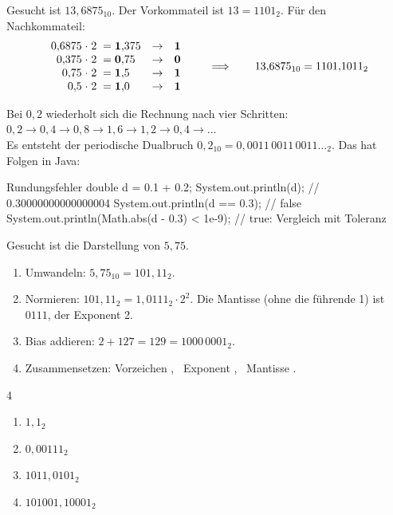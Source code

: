 Gesucht ist $13{,}6875_{10}$. Der Vorkommateil ist $13 = 1101_2$. Für den Nachkommateil:
\[
\begin{array}{r@{\;\cdot\;2\;=\;}l@{\quad\to\quad}c}
0{,}6875 & \mathbf{1}{,}375 & \mathbf{1} \\
0{,}375 & \mathbf{0}{,}75 & \mathbf{0} \\
0{,}75 & \mathbf{1}{,}5 & \mathbf{1} \\
0{,}5 & \mathbf{1}{,}0 & \mathbf{1}
\end{array}
\qquad\Longrightarrow\qquad 13{,}6875_{10} = 1101{,}1011_2
\]

Bei $0{,}2$ wiederholt sich die Rechnung nach vier Schritten: $0{,}2 \to 0{,}4 \to 0{,}8 \to 1{,}6 \to 1{,}2 \to 0{,}4 \to \ldots$\\
Es entsteht der periodische Dualbruch $0{,}2_{10} = 0{,}0011\,0011\,0011\ldots_2$. Das hat Folgen in Java:
\begin{javacode}[Ausschnitt]{Rundungsfehler}
double d = 0.1 + 0.2;
System.out.println(d);                            // 0.30000000000000004
System.out.println(d == 0.3);                     // false
System.out.println(Math.abs(d - 0.3) < 1e-9);     // true: Vergleich mit Toleranz
\end{javacode}

Gesucht ist die Darstellung von $5{,}75$.
\begin{enumerate}[itemsep=0.1em]
\item Umwandeln: $5{,}75_{10} = 101{,}11_2$.
\item Normieren: $101{,}11_2 = 1{,}0111_2 \cdot 2^2$. Die Mantisse (ohne die führende 1) ist $0111$, der Exponent 2.
\item Bias addieren: $2 + 127 = 129 = 1000\,0001_2$.
\item Zusammensetzen: Vorzeichen , \ Exponent , \ Mantisse .
\end{enumerate}

\aufgaben
{}
\begin{multicols}{4}
\begin{enumerate}[label=\alph*)]
\item $1{,}1_2$
\item $0{,}00111_2$
\item $1011{,}0101_2$
\item $101001{,}10001_2$
\end{enumerate}
\end{multicols}

